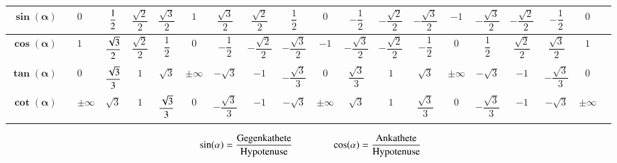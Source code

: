 {\begin{tabularx}{3\columnwidth}{rp{1mm}V{3}*{17}{C}}
        $\bm{\sin(\alpha)}$                                              &             & $0$                           & $\dfrac{1}{2\mathstrut}$        & $\dfrac{\sqrt{2}}{2}$ & $\dfrac{\sqrt{3}}{2}$           & $1$              & $\dfrac{\sqrt{3}}{2}$  & $\dfrac{\sqrt{2}}{2}$  & $\dfrac{1}{2}$         & $0$         & $-\dfrac{1}{2}$        & $-\dfrac{\sqrt{2}}{2}$ & $-\dfrac{\sqrt{3}}{2}$ & $-1$              & $-\dfrac{\sqrt{3}}{2}$ & $-\dfrac{\sqrt{2}}{2}$ & $-\dfrac{1}{2}$       & $0$         \\\hline
        $\bm{\cos(\alpha)}$                                              &             & $1$                           & $\dfrac{\sqrt{3}}{2\mathstrut}$ & $\dfrac{\sqrt{2}}{2}$ & $\dfrac{1}{2}$                  & $0$              & $-\dfrac{1}{2}$        & $-\dfrac{\sqrt{2}}{2}$ & $-\dfrac{\sqrt{3}}{2}$ & $-1$        & $-\dfrac{\sqrt{3}}{2}$ & $-\dfrac{\sqrt{2}}{2}$ & $-\dfrac{1}{2}$        & $0$               & $\dfrac{1}{2}$         & $\dfrac{\sqrt{2}}{2}$  & $\dfrac{\sqrt{3}}{2}$ & $1$         \\\hline
        $\bm{\tan(\alpha)}$                                              &             & $0$                           & $\dfrac{\sqrt{3}}{3\mathstrut}$ & $1$                   & $\sqrt{3}$                      & $\pm\infty$
                                                                         & $-\sqrt{3}$ & $-1$                          & $-\dfrac{\sqrt{3}}{3}$          & $0$                   & $\dfrac{\sqrt{3}}{3}$           & $1$              & $\sqrt{3}$             & $\pm\infty$            & $-\sqrt{3}$            & $-1$        & $-\dfrac{\sqrt{3}}{3}$ & $0$                                                                                                                                                         \\\hline
        $\bm{\cot(\alpha)}$                                              &             & $\pm\infty$                   & $\sqrt{3}$                      & $1$                   & $\dfrac{\sqrt{3}}{3\mathstrut}$ & $0$              & $-\dfrac{\sqrt{3}}{3}$ & $-1$                   & $-\sqrt{3}$            & $\pm\infty$ & $\sqrt{3}$             & $1$                    & $\dfrac{\sqrt{3}}{3}$  & $0$               & $-\dfrac{\sqrt{3}}{3}$ & $-1$                   & $-\sqrt{3}$           & $\pm\infty$ \\
    \end{tabularx}}
\endgroup

\[\sin(\alpha) = \frac{\rm Gegenkathete}{\rm Hypotenuse} \qquad \qquad \cos(\alpha) = \frac{\rm Ankathete}{\rm Hypotenuse}\]

